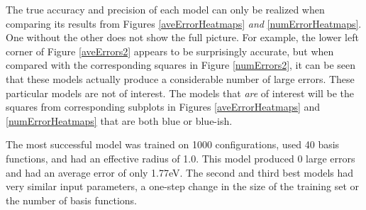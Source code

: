\par The true accuracy and precision of each model can only be realized when comparing its results from Figures \ref{aveErrorHeatmaps} \textit{and} \ref{numErrorHeatmaps}. One without the other does not show the full picture. For example, the lower left corner of Figure \ref{aveErrors2} appears to be surprisingly accurate, but when compared with the corresponding squares in Figure \ref{numErrors2}, it can be seen that these models actually produce a considerable number of large errors. These particular models are not of interest. The models that \textit{are} of interest will be the squares from corresponding subplots in Figures \ref{aveErrorHeatmaps} and \ref{numErrorHeatmaps} that are both blue or blue-ish. 
\par The most successful model was trained on 1000 configurations, used 40 basis functions, and had an effective radius of 1.0. This model produced 0 large errors and had an average error of only 1.77eV. The second and third best models had very similar input parameters, a one-step change in the size of the training set or the number of basis functions.
